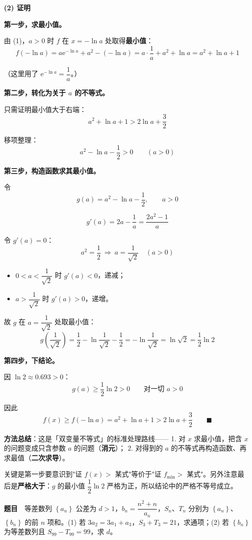\textbf{(2) 证明}

\textbf{第一步，求最小值。}

由 (1)，$a>0$ 时 $f$ 在 $x=-\ln a$ 处取得\textbf{最小值}：
\[f(-\ln a)=a\mathrm e^{-\ln a}+a^{2}-(-\ln a)=a\cdot\frac1a+a^{2}+\ln a=a^{2}+\ln a+1\]

（这里用了 $\mathrm e^{-\ln a}=\dfrac1a$。）

\textbf{第二步，转化为关于 $a$ 的不等式。}

只需证明最小值大于右端：
\[a^{2}+\ln a+1>2\ln a+\frac32\]

移项整理：
\[a^{2}-\ln a-\frac12>0\qquad(a>0)\]

\textbf{第三步，构造函数求其最小值。}

令
\[g(a)=a^{2}-\ln a-\frac12,\qquad a>0\]

\[g'(a)=2a-\frac1a=\frac{2a^{2}-1}a\]

令 $g'(a)=0$：
\[a^{2}=\frac12\ \Longrightarrow\ a=\frac1{\sqrt2}\quad(a>0)\]

\begin{itemize}
\item $0<a<\dfrac1{\sqrt2}$ 时 $g'(a)<0$，递减；
\item $a>\dfrac1{\sqrt2}$ 时 $g'(a)>0$，递增。
\end{itemize}

故 $g$ 在 $a=\dfrac1{\sqrt2}$ 处取最小值：
\[g\left(\frac1{\sqrt2}\right)=\frac12-\ln\frac1{\sqrt2}-\frac12=-\ln\frac1{\sqrt2}=\ln\sqrt2=\frac12\ln2\]

\textbf{第四步，下结论。}

因 $\ln2\approx0.693>0$：
\[g(a)\ge\frac12\ln2>0\qquad\text{对一切 }a>0\]

因此
\[f(x)\ge f(-\ln a)=a^{2}+\ln a+1>2\ln a+\frac32\qquad\blacksquare\]

\begin{gktip}
\textbf{方法总结}：这是「双变量不等式」的标准处理路线——
1. 对 $x$ 求最小值，把含 $x$ 的问题变成只含参数 $a$ 的问题（\textbf{消元}）；
2. 对得到的 $a$ 的不等式再构造函数、再求最值（\textbf{二次求导}）。

关键是第一步要意识到"证 $f(x)>$ 某式"等价于"证 $f_{\min}>$ 某式"。另外注意最后是\textbf{严格大于}：$g$ 的最小值 $\dfrac12\ln2$ 严格为正，所以结论中的严格不等号成立。
\end{gktip}

\par\medskip


\textbf{题目}　等差数列 $\left\{a_n\right\}$ 公差为 $d>1$，$b_n=\dfrac{n^{2}+n}{a_n}$，$S_n$、$T_n$ 分别为 $\left\{a_n\right\}$、$\left\{b_n\right\}$ 的前 $n$ 项和。(1) 若 $3a_2=3a_1+a_3$，$S_3+T_3=21$，求通项；(2) 若 $\left\{b_n\right\}$ 为等差数列且 $S_{99}-T_{99}=99$，求 $d$。


